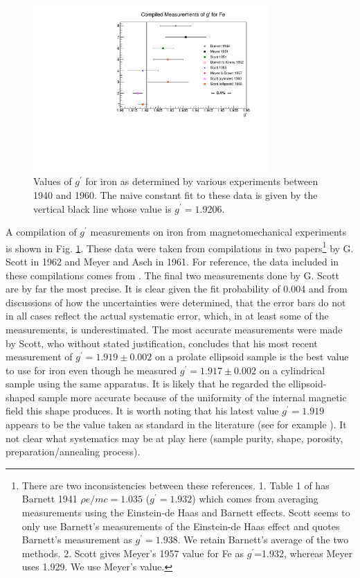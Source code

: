 \documentclass[preprint,12pt]{elsarticle}
\begin{document}
\begin{figure}[t]
\centering
\includegraphics[width=0.8\textwidth]{gprime_world_data_Fe.pdf}
\caption{Values of $g^{\prime}$ for iron as determined by various experiments between 1940 and 1960. The naive constant fit to these data is given by the vertical black line whose value is $g^{\prime}=1.9206$.}
\label{fig:gprime_world_data_Fe}
\end{figure}
A compilation of $g^{\prime}$ measurements on iron from magnetomechanical experiments is shown in Fig. \ref{fig:gprime_world_data_Fe}. These data were taken from compilations in two papers\footnote{There are two inconsistencies between these references\cite{Scott1962,Meyer1961}. 1. Table 1 of \cite{Meyer1961} has Barnett 1941 $\rho e/mc=1.035$ ($g^\prime=1.932$) which comes from averaging measurements using the Einstein-de Haas and Barnett effects. Scott seems to only use Barnett's measurements of the Einstein-de Haas effect and quotes Barnett's measurement as $g^\prime=1.938$. We retain Barnett's average of the two methods. 2. Scott \cite{Scott1962} gives Meyer's 1957 value for Fe as $g^\prime$=1.932, whereas Meyer \cite{Meyer1961} uses 1.929. We use Meyer's value.} 
 by G. Scott in 1962\cite{Scott1962} and Meyer and Asch in 1961\cite{Meyer1961}. For reference, the data included in these compilations comes from \cite{Barnett1944,Scott1951,Barnett1952,Meyer1957,Scott1960}. The final two measurements done by G. Scott are by far the most precise. It is clear given the fit probability of 0.004 and from discussions of how the uncertainties were determined, that the error bars do not in all cases reflect the actual systematic error, which, in at least some of the measurements, is underestimated. The most accurate measurements were made by Scott, who without stated justification, concludes that his most recent measurement of $g^{\prime}=1.919\pm0.002$ on a prolate ellipsoid sample is the best value to use for iron \cite{Scott1960, Scott1962} even though he measured  $g^{\prime}=1.917\pm0.002$ on a cylindrical sample using the same apparatus. It is likely that he regarded the ellipsoid-shaped sample more accurate because of the uniformity of the internal magnetic field this shape produces. It is worth noting that his latest value  $g^{\prime}=1.919$ appears to be the value taken as standard in the literature (see for example \cite{Wohlfarth1980,Bonnenberg1986}). It not clear what systematics may be at play here (sample purity, shape, porosity, preparation/annealing process). 
 
\end{document}
